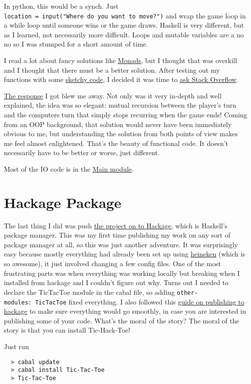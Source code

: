 \documentclass[12pt]{article}
\begin{document}
  In python, this would be a synch. Just
  \texttt{location\ =\ input("Where\ do\ you\ want\ to\ move?")} and wrap
  the game loop in a while loop until someone wins or the game draws.
  Haskell is very different, but as I learned, not necessarily more
  difficult. Loops and mutable variables are a no no so I was stumped for
  a short amount of time.

  I read a lot about fancy solutions like
  \href{http://projects.haskell.org/operational/examples/TicTacToe.hs.html}{Monads},
  but I thought that was overkill and I thought that there must be a
  better solution. After testing out my functions with some
  \href{https://github.com/2016rshah/Tic-Hack-Toe/commit/201ef6f4ab5bdcd74675f582dcabe47468d49522}{sketchy
  code}, I decided it was time to
  \href{http://stackoverflow.com/questions/32670948/take-input-from-user-until-tic-tac-toe-game-ends}{ask
  Stack Overflow}.

  \href{http://stackoverflow.com/a/32671373/3861396}{The response} I got
  blew me away. Not only was it very in-depth and well explained, the idea
  was so elegant: mutual recursion between the player's turn and the
  computers turn that simply stops recurring when the game ends! Coming
  from an OOP background, that solution would never have been immediately
  obvious to me, but understanding the solution from both points of view
  makes me feel almost enlightened. That's the beauty of functional code.
  It doesn't necessarily have to be better or worse, just different.

  Most of the IO code is in the
  \href{https://github.com/2016rshah/Tic-Hack-Toe/blob/master/src/Main.hs}{Main
  module}.

  \section{Hackage Package}\label{hackage-package}

  The last thing I did was push
  \href{https://hackage.haskell.org/package/Tic-Tac-Toe-0.1.0.2}{the
  project on to Hackage}, which is Haskell's package manager. This was my
  first time publishing my work on any sort of package manager at all, so
  this was just another adventure. It was surprisingly easy because mostly
  everything had already been set up using
  \href{https://github.com/khanage/heineken}{heineken} (which is so
  awesome), it just involved changing a few config files. One of the most
  frustrating parts was when everything was working locally but breaking
  when I installed from hackage and I couldn't figure out why. Turns out I
  needed to declare the TicTacToe module in the cabal file, so adding
  \texttt{other-modules:\ TicTacToe} fixed everything. I also followed
  this
  \href{http://begriffs.com/posts/2014-10-25-creating-package-hackage.html}{guide
  on publishing to hackage} to make sure everything would go smoothly, in
  case you are interested in publishing some of your code. What's the
  moral of the story? The moral of the story is that you can install
  Tic-Hack-Toe!

  Just run

  \begin{lstlisting}
  > cabal update 
  > cabal install Tic-Tac-Toe 
  > Tic-Tac-Toe
  \end{lstlisting}
\end{document}
